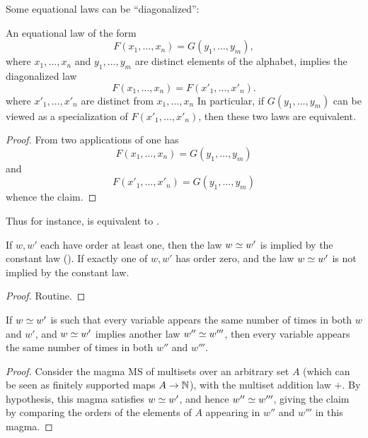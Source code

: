 Some equational laws can be ``diagonalized'':

\begin{theorem}[Diagonalization]\label{diag}
  An equational law of the form
  \begin{equation}\label{prediag}
    F(x_1,\dots,x_n) = G(y_1,\dots,y_m),
  \end{equation}
  where $x_1,\dots,x_n$ and $y_1,\dots,y_m$ are distinct elements of the alphabet, implies the diagonalized law
  $$ F(x_1,\dots,x_n) = F(x'_1,\dots,x'_n).$$
  where $x'_1,\dots,x'_n$ are distinct from $x_1,\dots,x_n$
  In particular, if $G(y_1,\dots,y_m)$ can be viewed as a specialization of $F(x'_1,\dots,x'_n)$, then these two laws are equivalent.
\end{theorem}

\begin{proof}
  From two applications of  one has
  $$ F(x_1,\dots,x_n) = G(y_1,\dots,y_m)$$
  and
  $$ F(x'_1,\dots,x'_n) = G(y_1,\dots,y_m)$$
  whence the claim.
\end{proof}

Thus for instance,  is equivalent to .

\begin{theorem}\label{constant-impl}
  If $w, w'$ each have order at least one, then the law $w \simeq w'$ is implied by the constant law (). If exactly one of $w, w'$ has order zero, and the law $w \simeq w'$ is not implied by the constant law.
\end{theorem}

\begin{proof}
  Routine.
\end{proof}

\begin{theorem}\label{variable-impl}\leanok
  If $w \simeq w'$ is such that every variable appears the same number of times in both $w$ and $w'$, and $w \simeq w'$ implies another law $w'' \simeq w'''$, then every variable appears the same number of times in both $w''$ and $w'''$.
\end{theorem}

\begin{proof}
  Consider the magma $\mathrm{MS}$ of multisets over an arbitrary set $A$ (which can be seen as finitely supported maps $A\rightarrow \mathbb{N}$), with the multiset addition law $+$. By hypothesis, this magma satisfies $w \simeq w'$, and hence $w'' \simeq w'''$, giving the claim by comparing the orders of the elements of $A$ appearing in $w''$ and $w'''$ in this magma.
\end{proof}
